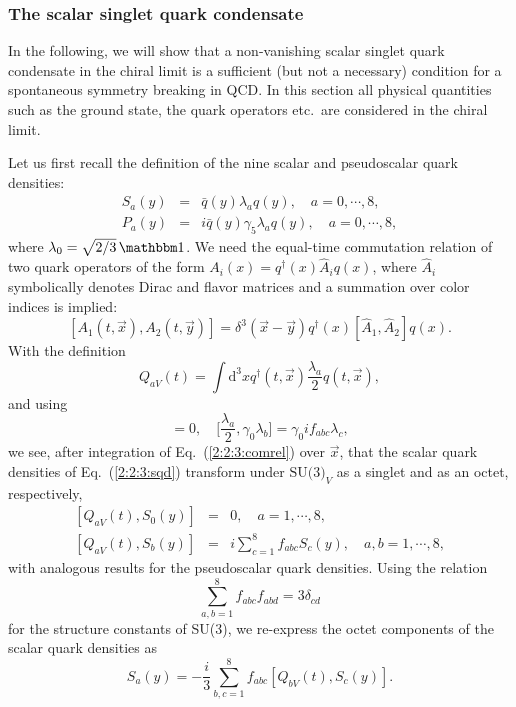 \documentclass[twoside,12pt]{article}
\begin{document}
\subsubsection{The scalar singlet quark condensate}
\label{subsec_sqc}
   In the following, we will show that a non-vanishing scalar singlet quark condensate
in the chiral limit is a sufficient (but not a necessary) condition for a
spontaneous symmetry breaking in QCD. In this section all physical
quantities such as the ground state, the quark operators etc.\ are considered
in the chiral limit.

   Let us first recall the definition of the nine scalar and pseudoscalar
quark densities:
\begin{eqnarray}
\label{2:2:3:sqd}
S_a(y)&=&\bar{q}(y)\lambda_a q(y),
\quad a=0,\cdots,8,\\
\label{4:1:psqd} P_a(y)&=&i\bar{q}(y)\gamma_5\lambda_a  q(y),
\quad a=0,\cdots,8,
\end{eqnarray}
where $\lambda_0=\sqrt{2/3}\,\mathbbm 1$.
   We need the equal-time commutation relation of two quark operators of the form
$A_i(x)=q^\dagger(x)\hat{A}_i q(x)$,
where $\hat{A}_i$ symbolically denotes Dirac and flavor matrices and
a summation over color indices is implied:
\begin{equation}
\label{2:2:3:comrel}
[A_1(t,\vec{x}),A_2(t,\vec{y})]=\delta^3(\vec{x}-\vec{y})
q^\dagger(x)[\hat{A}_1,\hat{A}_2]q(x).
\end{equation}
   With the definition
\begin{displaymath}
Q_{aV}(t)=\int \mbox{d}^3 x q^\dagger(t,\vec{x}) \frac{\lambda_a}{2} q(t,\vec{x}),
\end{displaymath}
   and using
\begin{displaymath}
[\frac{\lambda_a}{2},\gamma_0\lambda_0]=0,\quad
{[}\frac{\lambda_a}{2},\gamma_0\lambda_b]=
\gamma_0 i f_{abc} \lambda_c,
\end{displaymath}
we see, after integration of Eq.\ (\ref{2:2:3:comrel})
over $\vec{x}$, that the scalar quark densities of
Eq.\ (\ref{2:2:3:sqd}) transform under
$\mbox{SU(3)}_V$ as a singlet and as an octet, respectively,
\begin{eqnarray}
\label{2:2:3:sitr}
[Q_{aV}(t),S_0(y)]&=&0,\quad a=1,\cdots,8,\\
\label{2:2:3:octr}
{[Q_{aV}(t),S_b(y)]}&=&i\sum_{c=1}^8f_{abc}S_c(y),
\quad a,b=1,\cdots,8,
\end{eqnarray}
with analogous results for the pseudoscalar quark densities.
   Using the relation
\begin{equation}
\sum_{a,b=1}^8 f_{abc}f_{abd}=3\delta_{cd}
\end{equation}
for the structure constants of SU(3), we re-express the octet components of
the scalar quark densities as
\begin{equation}
\label{2:2:3:soktett}
S_a(y)=-\frac{i}{3}\sum_{b,c=1}^8f_{abc}[Q_{bV}(t),S_c(y)].
\end{equation}
\end{document}
